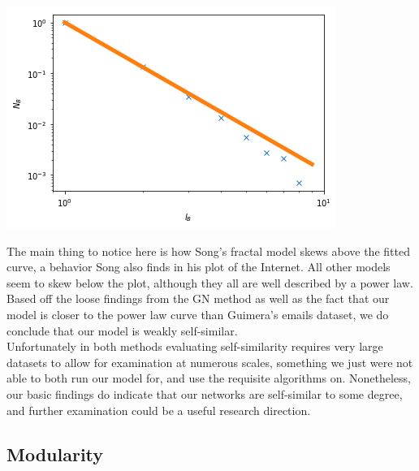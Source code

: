 \documentclass[12pt,twoside]{report}
\begin{document}
\begin{center}
\begin{minipage}{0.45\linewidth}
\end{minipage}%
\hfill
\begin{minipage}{0.45\linewidth}
\includegraphics[width=\linewidth]{figures/1500_hausdorff.png}
\end{minipage}
\end{center}


The main thing to notice here is how Song's fractal model skews above the fitted curve, a behavior Song also finds in his plot of the Internet. All other models seem to skew below the plot, although they all are well described by a power law. Based off the loose findings from the GN method as well as the fact that our model is closer to the power law curve than Guimera's emails dataset, we do conclude that our model is weakly self-similar. \\

Unfortunately in both methods evaluating self-similarity requires very large datasets to allow for examination at numerous scales, something we just were not able to both run our model for, and use the requisite algorithms on. Nonetheless, our basic findings do indicate that our networks are self-similar to some degree, and further examination could be a useful research direction. \\


\subsection{Modularity}
\end{document}
